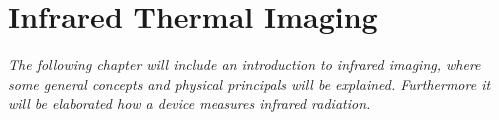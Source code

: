 \chapter{Infrared Thermal Imaging}

\textit{The following chapter will include an introduction to infrared imaging, where some general concepts and physical principals will be explained. Furthermore it will be elaborated how a device measures infrared radiation. }